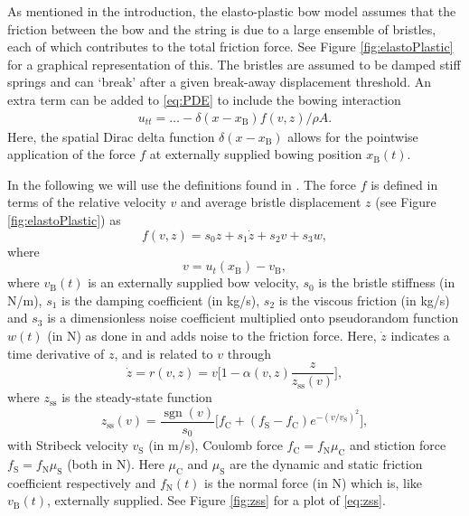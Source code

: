 \documentclass[twoside,a4paper,dvipsnames]{article}
\DeclareMathOperator{\sgn}{sgn}
\begin{document}
As mentioned in the introduction, the elasto-plastic bow model assumes that the friction between the bow and the string is due to a large ensemble of bristles, each of which contributes to the total friction force. See Figure \ref{fig:elastoPlastic} for a graphical representation of this. The bristles are assumed to be damped stiff springs and can `break' after a given break-away displacement threshold. An extra term can be added to \eqref{eq:PDE} to include the bowing interaction
\begin{equation}
    \begin{aligned}
    \label{eq:bowingTerm}
        u_{tt} = \hdots - \delta(x-x_\text{B})f(v, z)/\rho A.
    \end{aligned}
\end{equation}
Here, the spatial Dirac delta function $\delta(x-x_\text{B})$ allows for the pointwise application of the force $f$ at externally supplied bowing position $x_\text{B}(t)$. 

 In the following we will use the definitions found in \cite{Dupont2002}. The force $f$ is defined in terms of the relative velocity $v$ and average bristle displacement $z$ (see Figure \ref{fig:elastoPlastic}) as
\begin{equation}\label{eq:forceFunction}
    f(v, z) = s_0z + s_1\dot z + s_2v + s_3w,
\end{equation}
where \begin{equation}\label{eq:relVel}
  v = u_t(x_\text{B}) - v_\text{B},
\end{equation}
where $v_\text{B}(t)$ is an externally supplied bow velocity,
$s_0$ is the bristle stiffness (in N/m), $s_1$ is the damping coefficient (in kg/s), $s_2$ is the viscous friction (in kg/s) and $s_3$ is a dimensionless noise coefficient multiplied onto pseudorandom function $w(t)$ (in N) as done in \cite{Serafin2004} and adds noise to the friction force. Here, $\dot{z}$ indicates a time derivative of $z$, and is related to $v$ through
\begin{equation}\label{eq:zdot}
    \dot z = r(v, z) = v \bigg[ 1-  \alpha(v, z)\frac{z}{z_\text{ss}(v)}\bigg],
\end{equation}
where $z_\text{ss}$ is the steady-state function
\begin{equation}\label{eq:zss}
    z_\text{ss}(v) = \frac{\sgn(v)}{s_0}\Big[f_\text{C}+(f_\text{S}-f_\text{C})e^{-(v/v_\text{S})^2}\Big],
\end{equation}
with Stribeck velocity $v_\text{S}$ (in m/s), Coulomb force $f_\text{C} = f_\text{N}\mu_\text{C}$ and stiction force $f_\text{S} = f_\text{N}\mu_\text{S}$ (both in N). Here $\mu_\text{C}$ and $\mu_\text{S}$ are the dynamic and static friction coefficient respectively and $f_\text{N}(t)$ is the normal force (in N) which is, like $v_\text{B}(t)$, externally supplied. See Figure \ref{fig:zss} for a plot of \eqref{eq:zss}. 
\end{document}
